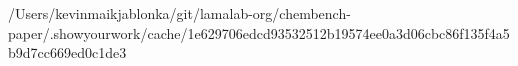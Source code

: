 /Users/kevinmaikjablonka/git/lamalab-org/chembench-paper/.showyourwork/cache/1e629706edcd93532512b19574ee0a3d06cbc86f135f4a5b9d7cc669ed0c1de3